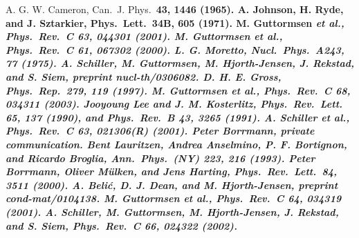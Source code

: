 \documentclass[sort&compress,final,numberedheadings]{aipproc}
\begin{document}
\begin{thebibliography}{9}
A. G. W. Cameron, Can.\ J. Phys.\ \bf 43\rm, 1446
(1965).
A. Johnson, H. Ryde, and J. Sztarkier, Phys.\ Lett.\ \bf 34B\rm, 
605 (1971).
M. Guttormsen \sl et al.\rm, Phys.\ Rev.\ C \bf 63\rm, 044301 
(2001).
M. Guttormsen \sl et al.\rm, Phys.\ Rev.\ C \bf 61\rm, 067302
(2000).
L. G. Moretto, Nucl.\ Phys.\ \bf A243\rm, 77 (1975).
A. Schiller, M. Guttormsen, M. Hjorth-Jensen, J. Rekstad, and S.
Siem, preprint nucl-th/0306082.
D. H. E. Gross, Phys.\ Rep.\ \bf 279\rm, 119 (1997).
M. Guttormsen \sl et al.\rm, Phys.\ Rev.\ C \bf 68\rm, 034311 
(2003).
Jooyoung Lee and J. M. Kosterlitz, Phys.\ Rev.\ Lett.\ \bf 
65\rm, 137 (1990), and Phys.\ Rev.\ B \bf 43\rm, 3265 (1991).
A. Schiller \sl et al.\rm, Phys.\ Rev.\ C \bf 63\rm, 021306(R) 
(2001).
Peter Borrmann, private communication.
Bent Lauritzen, Andrea Anselmino, P. F. Bortignon, and Ricardo 
Broglia, Ann.\ Phys.\ (NY) \bf 223\rm, 216 (1993). 
Peter Borrmann, Oliver M\"{u}lken, and Jens Harting, Phys.\ Rev.\
Lett.\ \bf 84\rm, 3511 (2000).
A. Beli\'{c}, D. J. Dean, and M. Hjorth-Jensen, preprint 
cond-mat/0104138.
M. Guttormsen \sl et al.\rm, Phys.\ Rev.\ C \bf 64\rm, 034319 
(2001).
A. Schiller, M. Guttormsen, M. Hjorth-Jensen, J. Rekstad, and S.
Siem, Phys.\ Rev.\ C \bf 66\rm, 024322 (2002).
\end{thebibliography}
\end{document}
